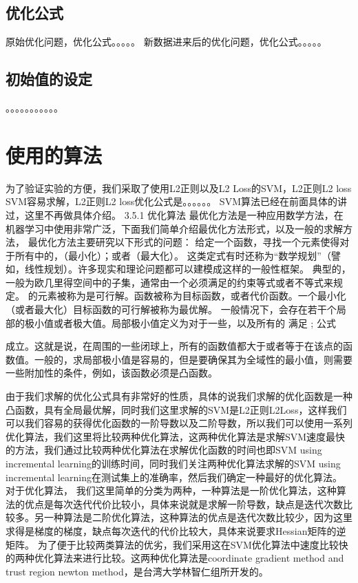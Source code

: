 \documentclass[master]{njuthesis}
\begin{document}
\subsection{优化公式}
原始优化问题，优化公式。。。。。
新数据进来后的优化问题，优化公式。。。。。

\subsection{初始值的设定}
。。。。。。。。。。。

\section{使用的算法}

为了验证实验的方便，我们采取了使用L2正则以及L2 Loss的SVM，L2正则L2 loss SVM容易求解，L2正则L2 loss优化公式是。。。。。。
SVM算法已经在前面具体的讲过，这里不再做具体介绍。
3.5.1 优化算法
最优化方法是一种应用数学方法，在机器学习中使用非常广泛，下面我们简单介绍最优化方法形式，以及一般的求解方法，
最优化方法主要研究以下形式的问题：
给定一个函数，寻找一个元素使得对于所有中的，（最小化）；或者（最大化）。
这类定式有时还称为“数学规划”（譬如，线性规划）。许多现实和理论问题都可以建模成这样的一般性框架。
典型的，一般为欧几里得空间中的子集，通常由一个必须满足的约束等式或者不等式来规定。 的元素被称为是可行解。函数被称为目标函数，或者代价函数。一个最小化（或者最大化）目标函数的可行解被称为最优解。
一般情况下，会存在若干个局部的极小值或者极大值。局部极小值定义为对于一些，以及所有的 满足
;
公式

成立。这就是说，在周围的一些闭球上，所有的函数值都大于或者等于在该点的函数值。一般的，求局部极小值是容易的，但是要确保其为全域性的最小值，则需要一些附加性的条件，例如，该函数必须是凸函数。

由于我们求解的优化公式具有非常好的性质，具体的说我们求解的优化函数是一种凸函数，具有全局最优解，同时我们这里求解的SVM是L2正则L2Loss，这样我们可以我们容易的获得优化函数的一阶导数以及二阶导数，所以我们可以使用一系列优化算法，我们这里将比较两种优化算法，这两种优化算法是求解SVM速度最快的方法，我们通过比较两种优化算法在求解优化函数的时间也即SVM using incremental learning的训练时间，同时我们关注两种优化算法求解的SVM using incremental learning在测试集上的准确率，然后我们确定一种最好的优化算法。
对于优化算法， 我们这里简单的分类为两种，一种算法是一阶优化算法，这种算法的优点是每次迭代代价比较小，具体来说就是求解一阶导数，缺点是迭代次数比较多。另一种算法是二阶优化算法，这种算法的优点是迭代次数比较少，因为这里求得是梯度的梯度，缺点每次迭代的代价比较大，具体来说要求Hessian矩阵的逆矩阵。
为了便于比较两类算法的优劣，我们采用这在SVM优化算法中速度比较快的两种优化算法来进行比较。这两种优化算法是coordinate gradient method and trust region newton method，是台湾大学林智仁组所开发的。
\end{document}
